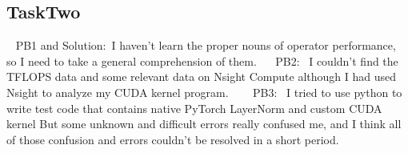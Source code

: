 \subsection{TaskTwo}~\newline
PB1 and Solution:~I haven't learn the proper nouns of operator performance, so I need to take a general 
comprehension of them.\newline
~\newline~
PB2:~ I couldn't find the TFLOPS data and some relevant data on Nsight Compute although I had used Nsight
to analyze my CUDA kernel program.\newline~
~\newline~
PB3:~ I tried to use python to write test code that contains native PyTorch LayerNorm and custom CUDA kernel
But some unknown and difficult errors really confused me, and I think all of those confusion and errors
couldn't be resolved in a short period.
